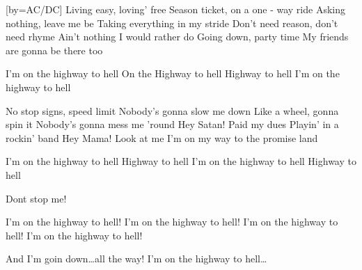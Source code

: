 [by={AC/DC}]
\beginverse
Living easy, loving' free 
Season ticket, on a one - way ride 
Asking nothing, leave me be 
Taking everything in my stride 
Don't need reason, don't need rhyme 
Ain't nothing I would rather do 
Going down, party time 
My friends are gonna be there too 
\endverse

\beginchorus
I'm on the highway to hell 
On the Highway to hell 
Highway to hell 
I'm on the highway to hell
\endchorus

\beginverse 
No stop signs, speed limit 
Nobody's gonna slow me down 
Like a wheel, gonna spin it 
Nobody's gonna mess me 'round 
Hey Satan! Paid my dues 
Playin' in a rockin' band 
Hey Mama! Look at me 
I'm on my way to the promise land
\endverse

\beginchorus
I'm on the highway to hell 
Highway to hell 
I'm on the highway to hell 
Highway to hell 
\endchorus
 
\beginverse
Dont stop me!
\endverse

\beginchorus
I'm on the highway to hell! 
I'm on the highway to hell! 
I'm on the highway to hell! 
I'm on the highway to hell!  
\endchorus

\beginverse 
And I'm goin down\dots all the way! 
I'm on the highway to hell\dots
\endverse
\endsong
